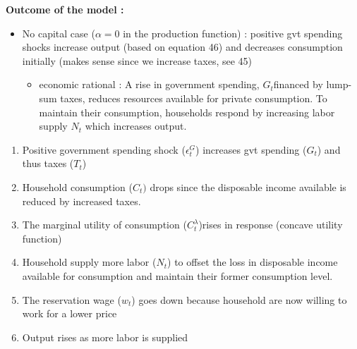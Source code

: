 \documentclass{article}
\begin{document}
\noindent\textbf{Outcome of the model :}
\begin{itemize}
    \item No capital case ($\alpha=0$ in the production function) : positive gvt spending shocks increase output (based on equation 46) and decreases consumption initially (makes sense since we increase taxes, see 45)
    \begin{itemize}
        \item economic rational : A rise in government spending, $G_t$financed by lump-sum taxes, reduces resources available for private consumption. To maintain their consumption, households respond by increasing labor supply $N_t$ which increases output. 
    \end{itemize}
\end{itemize}
\begin{responsebox}
    \begin{enumerate}
        \item Positive government spending shock ($\epsilon_t^G$) increases gvt spending ($G_t$) and thus taxes ($T_t$)
        \item Household consumption ($C_t)$ drops since the disposable income available is reduced by increased taxes.
        \item The marginal utility of consumption ($C_t^{\lambda}$)rises in response (concave utility function)
        \item Household supply more labor ($N_t$) to offset the loss in disposable income available for consumption and maintain their former consumption level.
        \item The reservation wage ($w_t$) goes down because household are now willing to work for a lower price
        \item Output rises as more labor is supplied
    \end{enumerate}
\end{responsebox} 
\end{document}
